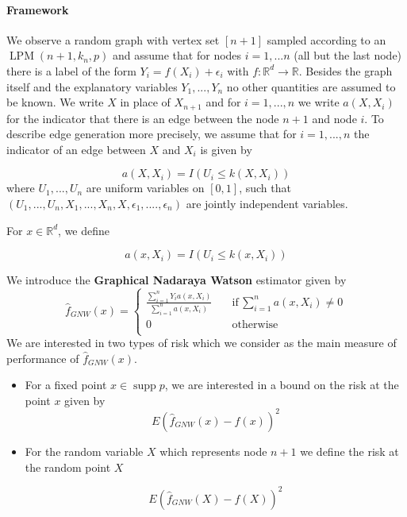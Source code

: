 \documentclass{article}
\DeclareMathOperator\supp{supp}
\DeclareMathOperator{\LPM}{LPM}
\begin{document}
\paragraph{Framework} We observe a random graph with vertex set $[n+1]$  sampled according to an $\LPM(n+1,k_n,p)$ and assume that for nodes $i=1,...n$ (all but the last node) there is a label of the form $Y_i=f(X_i)+\epsilon_i$ with $f\colon\mathbb{R}^d\to\mathbb{R}$. Besides the graph itself and the explanatory variables $Y_1,...,Y_n$ no other quantities are assumed to be known. We write $X$ in place of $X_{n+1}$ and for $i=1,...,n$ we write $a(X,X_i)$ for the indicator that there is an edge between the node $n+1$ and node $i$. To describe edge generation more precisely, we assume that for $i=1,...,n$ the indicator of an edge between $X$ and $X_{i}$ is given by 

\begin{equation*}
    a(X,X_{i})=I(U_i\leq k(X,X_i))
\end{equation*}
where $U_1,...,U_n$ are uniform variables on $[0,1]$, such that $(U_1,...,U_n,X_1,...,X_n,X,\epsilon_1,....,\epsilon_n)$ are jointly independent variables. 

For $x\in\mathbb{R}^d$, we define

\begin{equation*}
    a(x,X_i)=I(U_i\leq k(x,X_i))
\end{equation*}

We introduce the \textbf{Graphical Nadaraya Watson} estimator given by 
\begin{equation}
\label{gnw_def}
\hat{f}_{GNW}(x)=\begin{cases}
    \frac{\sum_{i=1}^n Y_ia(x,X_i)}{\sum_{i=1}^n a(x,X_i)} \quad &\text{if}\, \sum_{i=1}^n a(x,X_i)\neq 0\\
    0 \quad &\text{otherwise}\\
\end{cases}
\end{equation}
We are interested in two types of risk which we consider as the main measure of performance of $\hat{f}_{GNW}(x)$.


\begin{itemize}
    \item For a fixed point $x\in\supp{p}$, we are interested in a bound on the risk at the point $x$ given by
\begin{equation}
\label{fixed_point_risk}
    E(\hat{f}_{GNW}(x)-f(x))^2
\end{equation}
    \item For the random variable $X$ which represents node $n+1$ we define the risk at the random point $X$

\begin{equation}
\label{random_point_risk}
    E(\hat{f}_{GNW}(X)-f(X))^2
\end{equation}
\end{itemize}
\end{document}
